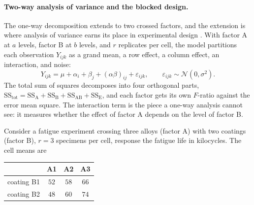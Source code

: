 \paragraph{Two-way analysis of variance and the blocked design.}
The one-way decomposition extends to two crossed factors, and the
extension is where analysis of variance earns its place in
experimental design \cite[ch.~5--7]{text:box-hunter-hunter-2005}.
With factor A at $a$ levels, factor B at $b$ levels, and $r$
replicates per cell, the model partitions each observation
$Y_{ijk}$ as a grand mean, a row effect, a column effect, an
interaction, and noise:
\[
Y_{ijk} = \mu + \alpha_{i} + \beta_{j} + (\alpha\beta)_{ij}
        + \varepsilon_{ijk},
\qquad \varepsilon_{ijk} \sim \mathcal{N}(0, \sigma^{2}).
\]
The total sum of squares decomposes into four orthogonal parts,
$\mathrm{SS_{tot}} = \mathrm{SS_{A}} + \mathrm{SS_{B}} +
\mathrm{SS_{AB}} + \mathrm{SS_{E}}$, and each factor gets its own
$F$-ratio against the error mean square. The interaction term is the
piece a one-way analysis cannot see: it measures whether the effect
of factor A depends on the level of factor B.

Consider a fatigue experiment crossing three alloys (factor A) with
two coatings (factor B), $r = 3$ specimens per cell, response the
fatigue life in kilocycles. The cell means are

\begin{center}
\small
\begin{tabular}{lccc}
\toprule
        & A1 & A2 & A3 \\
\midrule
coating B1 & $52$ & $58$ & $66$ \\
coating B2 & $48$ & $60$ & $74$ \\
\bottomrule
\end{tabular}
\end{center}

